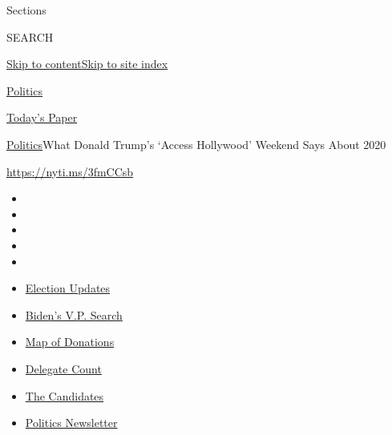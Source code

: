 Sections

SEARCH

\protect\hyperlink{site-content}{Skip to
content}\protect\hyperlink{site-index}{Skip to site index}

\href{https://www.nytimes.com/section/politics}{Politics}

\href{https://myaccount.nytimes.com/auth/login?response_type=cookie\&client_id=vi}{}

\href{https://www.nytimes.com/section/todayspaper}{Today's Paper}

\href{/section/politics}{Politics}\textbar{}What Donald Trump's `Access
Hollywood' Weekend Says About 2020

\url{https://nyti.ms/3fmCCsb}

\begin{itemize}
\item
\item
\item
\item
\item
\end{itemize}

\begin{itemize}
\item
  \href{https://www.nytimes.com/2020/07/31/us/elections/biden-vs-trump.html?action=click\&pgtype=Article\&state=default\&region=TOP_BANNER\&context=storylines_menu}{Election
  Updates}
\item
  \href{https://www.nytimes.com/article/biden-vice-president-2020.html?action=click\&pgtype=Article\&state=default\&region=TOP_BANNER\&context=storylines_menu}{Biden's
  V.P. Search}
\item
  \href{https://www.nytimes.com/interactive/2020/07/24/us/politics/trump-biden-campaign-donors.html?action=click\&pgtype=Article\&state=default\&region=TOP_BANNER\&context=storylines_menu}{Map
  of Donations}
\item
  \href{https://www.nytimes.com/interactive/2020/us/elections/delegate-count-primary-results.html?action=click\&pgtype=Article\&state=default\&region=TOP_BANNER\&context=storylines_menu}{Delegate
  Count}
\item
  \href{https://www.nytimes.com/interactive/2019/us/politics/2020-presidential-candidates.html?action=click\&pgtype=Article\&state=default\&region=TOP_BANNER\&context=storylines_menu}{The
  Candidates}
\item
  \href{https://www.nytimes.com/newsletters/politics?action=click\&pgtype=Article\&state=default\&region=TOP_BANNER\&context=storylines_menu}{Politics
  Newsletter}
\end{itemize}

